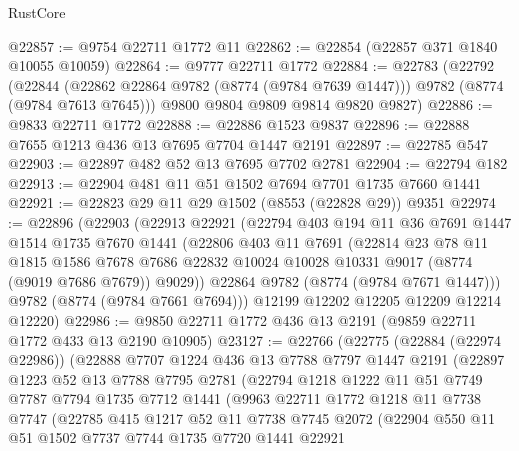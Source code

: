 \begin{lexlean}{RustCore}
\begin{coremodule}
@22857 := @9754 @22711 @1772 @11
@22862 := @22854 (@22857 @371 @1840 @10055 @10059)
@22864 := @9777 @22711 @1772
@22884 := @22783
    (@22792
      (@22844 (@22862 @22864 @9782 (@8774 (@9784 @7639 @1447))) @9782 (@8774 (@9784 @7613 @7645)))
      @9800
      @9804
      @9809
      @9814
      @9820
      @9827)
@22886 := @9833 @22711 @1772
@22888 := @22886 @1523 @9837
@22896 := @22888 @7655 @1213 @436 @13 @7695 @7704 @1447 @2191
@22897 := @22785 @547
@22903 := @22897 @482 @52 @13 @7695 @7702 @2781
@22904 := @22794 @182
@22913 := @22904 @481 @11 @51 @1502 @7694 @7701 @1735 @7660 @1441
@22921 := @22823 @29 @11 @29 @1502 (@8553 (@22828 @29)) @9351
@22974 := @22896
    (@22903
      (@22913
        @22921
        (@22794
          @403
          @194
          @11
          @36
          @7691
          @1447
          @1514
          @1735
          @7670
          @1441
          (@22806
            @403
            @11
            @7691
            (@22814
              @23
              @78
              @11
              @1815
              @1586
              @7678
              @7686
              @22832
              @10024
              @10028
              @10331
              @9017
              (@8774 (@9019 @7686 @7679))
              @9029))
          @22864
          @9782
          (@8774 (@9784 @7671 @1447)))
        @9782
        (@8774 (@9784 @7661 @7694)))
      @12199
      @12202
      @12205
      @12209
      @12214
      @12220)
@22986 := @9850 @22711 @1772 @436 @13 @2191 (@9859 @22711 @1772 @433 @13 @2190 @10905)
@23127 := @22766
    (@22775
      (@22884 (@22974 @22986))
      (@22888
        @7707
        @1224
        @436
        @13
        @7788
        @7797
        @1447
        @2191
        (@22897
          @1223
          @52
          @13
          @7788
          @7795
          @2781
          (@22794
            @1218
            @1222
            @11
            @51
            @7749
            @7787
            @7794
            @1735
            @7712
            @1441
            (@9963
              @22711
              @1772
              @1218
              @11
              @7738
              @7747
              (@22785
                @415
                @1217
                @52
                @11
                @7738
                @7745
                @2072
                (@22904
                  @550
                  @11
                  @51
                  @1502
                  @7737
                  @7744
                  @1735
                  @7720
                  @1441
                  @22921

\end{coremodule}
\end{lexlean}
